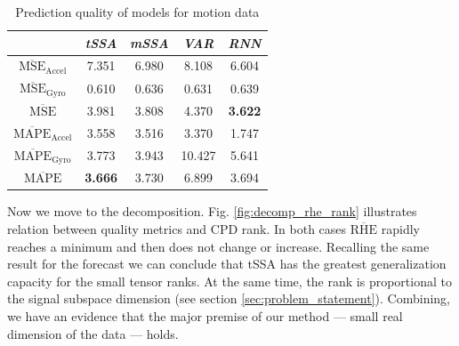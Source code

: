 \documentclass[referee, pdflatex, sn-mathphys-num]{sn-jnl}
\theoremstyle{definition}
\theoremstyle{plain}
\begin{document}
	\def\arraystretch{1.2}
	\begin{table}[h]
		\centering
		\caption{Prediction quality of models for motion data}\label{tab:pred_res_motion}
		\begin{tabular}{|c|c|c|c|c|}
			\hline
			& \textit{tSSA}                & \textit{mSSA} & \textit{VAR} & \textit{RNN} \\ \hline
			$ \overline{\text{MSE}}_{\text{Accel}} $  & 7.351          & 6.980 & 8.108  & 6.604          \\ \hline
			$ \overline{\text{MSE}}_{\text{Gyro}} $   & 0.610          & 0.636 & 0.631  & 0.639          \\ \hline
			$ \overline{\text{MSE}} $         & 3.981          & 3.808 & 4.370  & \textbf{3.622} \\ \hline
			$ \overline{\text{MAPE}}_{\text{Accel}} $ & 3.558          & 3.516 & 3.370  & 1.747          \\ \hline
			$ \overline{\text{MAPE}}_{\text{Gyro}} $  & 3.773          & 3.943 & 10.427 & 5.641          \\ \hline
			$ \overline{\text{MAPE}} $        & \textbf{3.666} & 3.730 & 6.899  & 3.694          \\ \hline
		\end{tabular}
	\end{table}
	
	Now we move to the decomposition. Fig. \ref{fig:decomp_rhe_rank} illustrates relation between quality metrics and CPD rank. In both cases $ \overline{\text{RHE}} $ rapidly reaches a minimum and then does not change or increase. Recalling the same result for the forecast we can conclude that tSSA has the greatest generalization capacity for the small tensor ranks. At the same time, the rank is proportional to the signal subspace dimension (see section \ref{sec:problem_statement}). Combining, we have an evidence that the major premise of our method --- small real dimension of the data --- holds.
	
\end{document}
